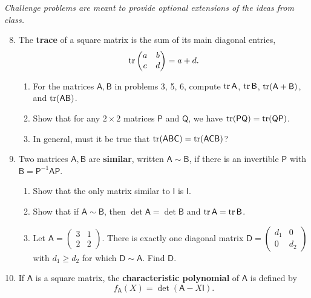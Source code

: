 \emph{Challenge problems are meant to provide optional extensions of the ideas from class.}

\begin{enumerate}\setcounter{enumi}{7}
\item The \textbf{trace} of a square matrix is the sum of its main diagonal entries,
\begin{equation*}
\operatorname{tr}\begin{pmatrix} a & b \\ c & d \end{pmatrix} = a + d.
\end{equation*}
\begin{enumerate}
\item For the matrices $\mathsf{A},\mathsf{B}$ in problems 3, 5, 6, compute $\operatorname{tr}\mathsf{A}$, $\operatorname{tr}\mathsf{B}$, $\operatorname{tr}(\mathsf{A} + \mathsf{B})$, and $\operatorname{tr}(\mathsf{AB})$.
\item Show that for any $2\times 2$ matrices $\mathsf{P}$ and $\mathsf{Q}$, we have $\operatorname{tr}(\mathsf{PQ}) = \operatorname{tr}(\mathsf{QP})$.
\item In general, must it be true that $\operatorname{tr}(\mathsf{ABC}) = \operatorname{tr}(\mathsf{ACB})$?
\end{enumerate}
\item Two matrices $\mathsf{A},\mathsf{B}$ are \textbf{similar}, written $\mathsf{A}\sim\mathsf{B}$, if there is an invertible $\mathsf{P}$ with $\mathsf{B} = \mathsf{P}^{-1}\mathsf{AP}$.
\begin{enumerate}
\item Show that the only matrix similar to $\mathsf{I}$ is $\mathsf{I}$.
\item Show that if $\mathsf{A}\sim\mathsf{B}$, then $\det\mathsf{A} = \det\mathsf{B}$ and $\operatorname{tr}\mathsf{A} = \operatorname{tr}\mathsf{B}$.
\item Let $\mathsf{A} = \begin{pmatrix} 3 & 1 \\ 2 & 2 \end{pmatrix}$. There is exactly one diagonal matrix $\mathsf{D} = \begin{pmatrix} d_1 & 0 \\ 0 & d_2 \end{pmatrix}$ with $d_1\geq d_2$ for which $\mathsf{D}\sim\mathsf{A}$. Find $\mathsf{D}$.
\end{enumerate}
\item If $\mathsf{A}$ is a square matrix, the \textbf{characteristic polynomial} of $\mathsf{A}$ is defined by
\begin{equation*}
f_{\mathsf{A}}(X) = \det(\mathsf{A} - X\mathsf{I}).

\end{equation*}
\end{enumerate}
